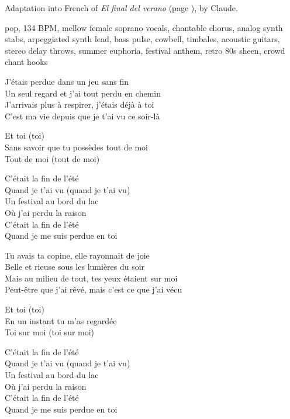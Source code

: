 
\begin{notes}
Adaptation into French of \emph{El final del verano} (page \pageref{sec:verano}), by Claude.
\end{notes}
\begin{style}
pop, 134 BPM, mellow female soprano vocals, chantable chorus, analog synth stabs, arpeggiated synth lead, bass pulse, cowbell, timbales, acoustic guitars, stereo delay throws, summer euphoria, festival anthem, retro 80s sheen, crowd chant hooks
\end{style}
\begin{lyrics}
J’étais perdue dans un jeu sans fin\\
Un seul regard et j’ai tout perdu en chemin\\
J’arrivais plus à respirer, j’étais déjà à toi\\
C’est ma vie depuis que je t’ai vu ce soir-là

Et toi (toi)\\
Sans savoir que tu possèdes tout de moi\\
Tout de moi (tout de moi)

C’était la fin de l’été\\
Quand je t’ai vu (quand je t’ai vu)\\
Un festival au bord du lac\\
Où j’ai perdu la raison\\
C’était la fin de l’été\\
Quand je me suis perdue en toi

Tu avais ta copine, elle rayonnait de joie\\
Belle et rieuse sous les lumières du soir\\
Mais au milieu de tout, tes yeux étaient sur moi\\
Peut-être que j’ai rêvé, mais c’est ce que j’ai vécu

Et toi (toi)\\
En un instant tu m’as regardée\\
Toi sur moi (toi sur moi)

C’était la fin de l’été\\
Quand je t’ai vu (quand je t’ai vu)\\
Un festival au bord du lac\\
Où j’ai perdu la raison\\
C’était la fin de l’été\\
Quand je me suis perdue en toi


\end{lyrics}
